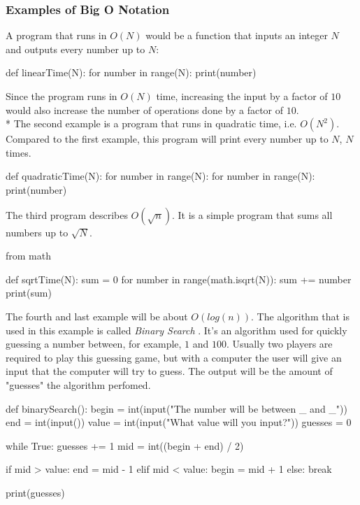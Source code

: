 \documentclass[main.tex]{subfiles}
\begin{document}
\subsubsection{Examples of Big O Notation}

A program that runs in $O(N)$ would be a function that inputs an integer $N$ and outputs every number up to $N$:
\begin{python}
def linearTime(N):
    for number in range(N):
        print(number)
\end{python}

Since the program runs in $O(N)$ time, increasing the input by a factor of $10$ would also increase the number of operations done by a factor of $10$.
\newline
\\*
The second example is a program that runs in quadratic time, i.e. $O(N^{2})$. Compared to the first example, this program will print every number up to $N$, $N$ times.

\begin{python}
    def quadraticTime(N):
        for number in range(N):
            for number in range(N):
                print(number)
\end{python}

\vspace{10mm}

The third program describes $O(\sqrt{n})$. It is a simple program that sums all numbers up to $\sqrt{N}$.

\begin{python}
    from math

    def sqrtTime(N):
        sum = 0
        for number in range(math.isqrt(N)):
            sum += number
        print(sum)
\end{python}

\vspace{10mm}

The fourth and last example will be about $O(log (n))$. The algorithm that is used in this example is called \textit{Binary Search} \cite{algh:binary_search}. It's an algorithm used for quickly guessing a number between, for example, $1$ and $100$. Usually two players are required to play this guessing game, but with a computer the user will give an input that the computer will try to guess. The output will be the amount of "guesses" the algorithm perfomed.

\begin{python}
    def binarySearch():
        begin = int(input("The number will be between _ and _\n"))
        end = int(input())
        value = int(input("What value will you input?\n"))
        guesses = 0

        while True:
            guesses += 1
            mid = int((begin + end) / 2)

            if mid > value:
                end = mid - 1
            elif mid < value:
                begin = mid + 1
            else:
                break

    print(guesses)

\end{python}

\end{document}
